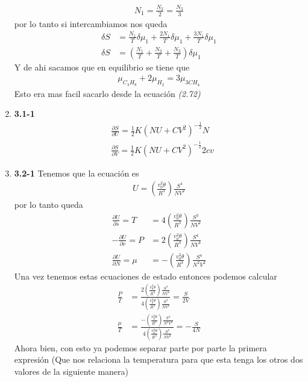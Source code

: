 \documentclass[12pt]{exam}
\begin{document}
\begin{enumerate}
		\begin{align*}
			N_1 = \frac{N_2}{2} = \frac{N_3}{3}
		\end{align*}
		por lo tanto si intercambiamos nos queda
		\begin{align*}
			\delta S &=  \frac{N_1}{T}\delta\mu_1 + \frac{2N_1}{T}\delta\mu_1 + \frac{3N_1}{T}\delta\mu_1\\
			\delta S &= ( \frac{N_1}{T} + \frac{N_2}{T} + \frac{N_3}{T})\delta\mu_1
		\end{align*}
		Y de ahi sacamos que en equilibrio se tiene que
		\begin{align*}
			\mu_{C_3H_8} + 2\mu_{H_2} = 3\mu_{3CH_4}
		\end{align*}
		Esto era mas facil sacarlo desde la ecuación \textit{(2.72)}
	\item \textbf{3.1-1}
		\begin{align*}
			&\frac{\partial S}{\partial U}=\frac{1}{2}K(NU+CV^2)^{-\frac{1}{2}}N\\
			&\frac{\partial S}{\partial V}=\frac{1}{2}K(NU+CV^2)^{-\frac{1}{2}}2cv
		\end{align*}
	\item \textbf{\textbf{3.2-1}} Tenemos que la ecuación es
		\begin{align*}
			U = \left(\frac{v_0^2\theta}{R^3}\right)\frac{S^4}{NV^2}
		\end{align*}
		por lo tanto queda
		\begin{align*}
			\frac{\partial U}{\partial s} = T &= 4\left(\frac{v_0^2\theta}{R^3}\right)\frac{S^3}{NV^2}\\
			-\frac{\partial U}{\partial v} = P &= 2\left(\frac{v_0^2\theta}{R^3}\right)\frac{S^4}{NV^3}\\
			\frac{\partial U}{\partial N} = \mu &= -\left(\frac{v_0^2\theta}{R^3}\right)\frac{S^4}{N^2V^2}
		\end{align*}
		Una vez tenemos estas ecuaciones de estado entonces podemos calcular
		\begin{align*}
			\frac{P}{T} &=\frac{2\left(\frac{v_0^2\theta}{R^3}\right)\frac{S^4}{NV^3}}{4\left(\frac{v_0^2\theta}{R^3}\right)\frac{S^3}{NV^2}} = \frac{S}{2V}\\ 
			\frac{\mu}{T} &=\frac{-\left(\frac{v_0^2\theta}{R^3}\right)\frac{S^4}{N^2V^2}}{4\left(\frac{v_0^2\theta}{R^3}\right)\frac{S^3}{NV^2}}=-\frac{S}{4N}
		\end{align*}
		Ahora bien, con esto ya podemos separar parte por parte la primera expresión (Que nos relaciona la temperatura para que esta tenga los otros dos valores de la siguiente manera)

\end{enumerate}
\end{document}
